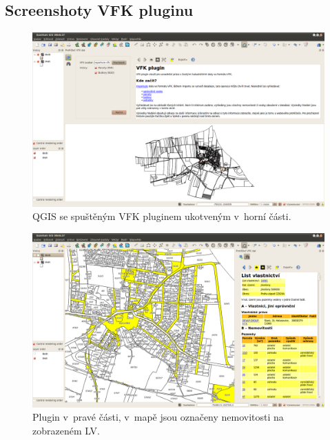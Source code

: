 \documentclass[a4paper,12pt]{article}
\begin{document}
\subsection{Screenshoty VFK pluginu}
\begin{figure}[h!]
\centering
\includegraphics[width=\textwidth]{./screenshoty/Quantum_GIS_08e6c37_028.png}
\caption{QGIS se spuštěným VFK pluginem ukotveným v~horní části.}
\label{fig:screenshot1}
\end{figure}

\begin{figure}[h!]
\centering
\includegraphics[width=\textwidth]{./screenshoty/Quantum_GIS_08e6c37_033.png}
\caption{Plugin v~pravé části, v~mapě jsou označeny nemovitosti na zobrazeném LV.}
\label{fig:screenshot2}
\end{figure}
\end{document}

